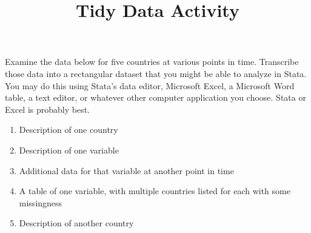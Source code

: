 \documentclass[a4paper,12pt]{article}
\title{Tidy Data Activity}
\author{}
\date{}
\begin{document}
\maketitle

Examine the data below for five countries at various points in time. Transcribe those data into a rectangular dataset that you might be able to analyze in Stata. You may do this using Stata's data editor, Microsoft Excel, a Microsoft Word table, a text editor, or whatever other computer application you choose. Stata or Excel is probably best.


\begin{enumerate}\itemsep2em

\item Description of one country

\item Description of one variable

\item Additional data for that variable at another point in time

\item A table of one variable, with multiple countries listed for each with some missingness

\item Description of another country


\end{enumerate}
\end{document}
